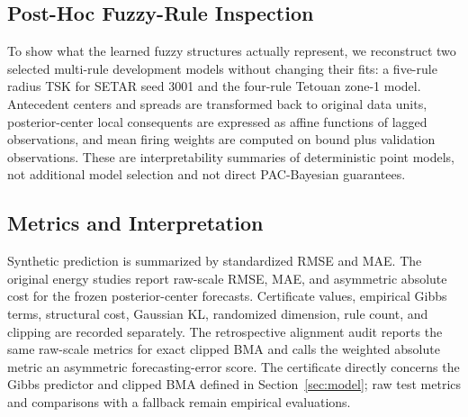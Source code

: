 \subsection{Post-Hoc Fuzzy-Rule Inspection}
To show what the learned fuzzy structures actually represent, we reconstruct two selected multi-rule development models without changing their fits: a five-rule radius TSK for SETAR seed 3001 and the four-rule Tetouan zone-1 model. Antecedent centers and spreads are transformed back to original data units, posterior-center local consequents are expressed as affine functions of lagged observations, and mean firing weights are computed on bound plus validation observations. These are interpretability summaries of deterministic point models, not additional model selection and not direct PAC-Bayesian guarantees.

\subsection{Metrics and Interpretation}
Synthetic prediction is summarized by standardized RMSE and MAE. The original energy studies report raw-scale RMSE, MAE, and asymmetric absolute cost for the frozen posterior-center forecasts. Certificate values, empirical Gibbs terms, structural cost, Gaussian KL, randomized dimension, rule count, and clipping are recorded separately. The retrospective alignment audit reports the same raw-scale metrics for exact clipped BMA and calls the weighted absolute metric an asymmetric forecasting-error score. The certificate directly concerns the Gibbs predictor and clipped BMA defined in Section~\ref{sec:model}; raw test metrics and comparisons with a fallback remain empirical evaluations.
